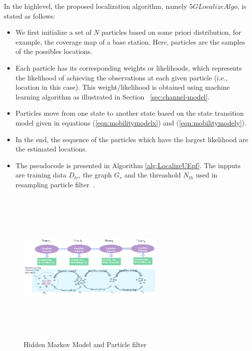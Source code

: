 \documentclass[conference, 10pt]{IEEEtran}
\begin{document}
In the highlevel, the proposed localization algorithm, namely $5GLocalizeAlgo$, is stated as follows:
\begin{itemize}
	\item We first initialize a set of $N$ particles based on some priori distribution, for example, the coverage map of a base station.
	Here, particles are the samples of the possibles locations. 
	\item Each particle has its corresponding weights or likelihoods, which represents the likelihood of achieving the observations at each given particle (i.e., location in this case). This weight/likelihood is obtained using machine learning algorithm as illustrated in Section ~\ref{sec:channel-model}.
	\item Particles move from one state to another state based 
	on the state transition model given in equations (\ref{eqn:mobilitymodelx}) and (\ref{eqn:mobilitymodely}).
	\item In the end, the sequence of the particles which have the largest likelihood are the estimated locations. 
	\item The pseudocode is presented in Algorithm \ref{alg:LocalizeUEpf}. The inpputs are training data $D_{tr}$, the graph $G_r$ and the threashold $N_{th}$ used in resampling particle filter~\cite{ThrunParticleFilter}.
\end{itemize}

\begin{figure}[t]
	\begin{center}
	\includegraphics[height=3in,width=2.8in]{./HMM_ParticleFilter_Illustration.png}
	\caption{\label{fig:hmm_particle}
	{\small Hidden Markov Model and Particle filter}}
	\end{center}
	\end{figure}
\end{document}
